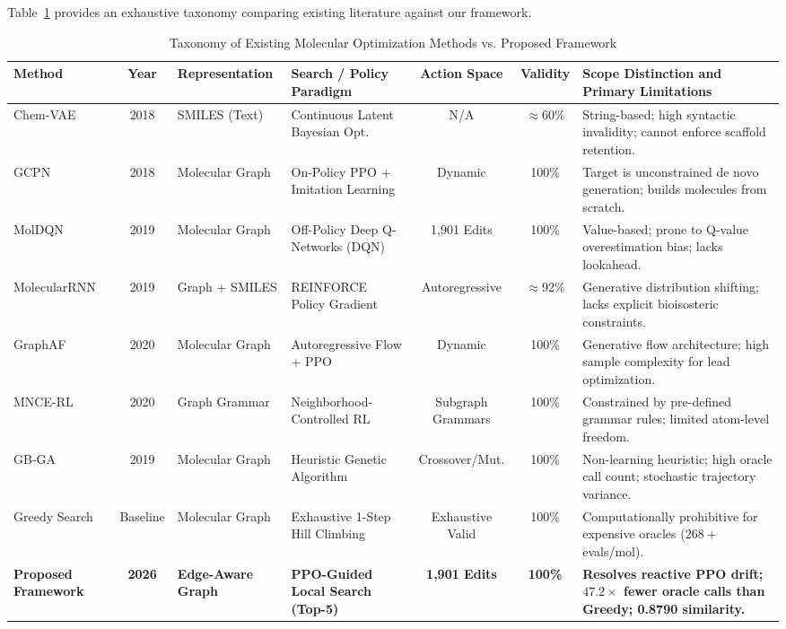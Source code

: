 \documentclass{ieeeaccess}
\begin{document}
Table~\ref{tab:literature} provides an exhaustive taxonomy comparing existing literature against our framework.

\begin{table}[!tbp]
\caption{Taxonomy of Existing Molecular Optimization Methods vs. Proposed Framework}
\label{tab:literature}
\centering
\footnotesize
\begin{tabularx}{\textwidth}{l c l l c c X}
\toprule
\textbf{Method} & \textbf{Year} & \textbf{Representation} & \textbf{Search / Policy Paradigm} & \textbf{Action Space} & \textbf{Validity} & \textbf{Scope Distinction and Primary Limitations}\\
\midrule
Chem-VAE \cite{gomez2018} & 2018 & SMILES (Text) & Continuous Latent Bayesian Opt. & N/A & $\approx 60\%$ & String-based; high syntactic invalidity; cannot enforce scaffold retention.\\
GCPN \cite{you2018} & 2018 & Molecular Graph & On-Policy PPO + Imitation Learning & Dynamic & 100\% & Target is unconstrained de novo generation; builds molecules from scratch.\\
MolDQN \cite{zhou2019} & 2019 & Molecular Graph & Off-Policy Deep Q-Networks (DQN) & 1,901 Edits & 100\% & Value-based; prone to Q-value overestimation bias; lacks lookahead.\\
MolecularRNN \cite{popova2019} & 2019 & Graph + SMILES & REINFORCE Policy Gradient & Autoregressive & $\approx 92\%$ & Generative distribution shifting; lacks explicit bioisosteric constraints.\\
GraphAF \cite{shi2020} & 2020 & Molecular Graph & Autoregressive Flow + PPO & Dynamic & 100\% & Generative flow architecture; high sample complexity for lead optimization.\\
MNCE-RL \cite{xu2020} & 2020 & Graph Grammar & Neighborhood-Controlled RL & Subgraph Grammars & 100\% & Constrained by pre-defined grammar rules; limited atom-level freedom.\\
GB-GA \cite{jensen2019} & 2019 & Molecular Graph & Heuristic Genetic Algorithm & Crossover/Mut. & 100\% & Non-learning heuristic; high oracle call count; stochastic trajectory variance.\\
Greedy Search & Baseline & Molecular Graph & Exhaustive 1-Step Hill Climbing & Exhaustive Valid & 100\% & Computationally prohibitive for expensive oracles ($268+$ evals/mol).\\
\midrule
\textbf{Proposed Framework} & \textbf{2026} & \textbf{Edge-Aware Graph} & \textbf{PPO-Guided Local Search (Top-5)} & \textbf{1,901 Edits} & \textbf{100\%} & \textbf{Resolves reactive PPO drift; $47.2\times$ fewer oracle calls than Greedy; 0.8790 similarity.}\\
\bottomrule
\end{tabularx}
\end{table}
\end{document}
